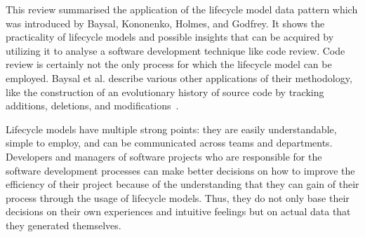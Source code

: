 \documentclass[conference]{IEEEtran}
\begin{document}
This review summarised the application of the lifecycle model data pattern which was introduced by Baysal, Kononenko, Holmes, and Godfrey. It shows the practicality of lifecycle models and possible insights that can be acquired by utilizing it to analyse a software development technique like code review. Code review is certainly not the only process for which the lifecycle model can be employed. Baysal et al. describe various other applications of their methodology, like the construction of an evolutionary history of source code by tracking additions, deletions, and modifications~\cite{baysal2015synthesizing}.

Lifecycle models have multiple strong points: they are easily understandable, simple to employ, and can be communicated across teams and departments. Developers and managers of software projects who are responsible for the software development processes can make better decisions on how to improve the efficiency of their project because of the understanding that they can gain of their process through the usage of lifecycle models. Thus, they do not only base their decisions on their own experiences and intuitive feelings but on actual data that they generated themselves.



\end{document}
